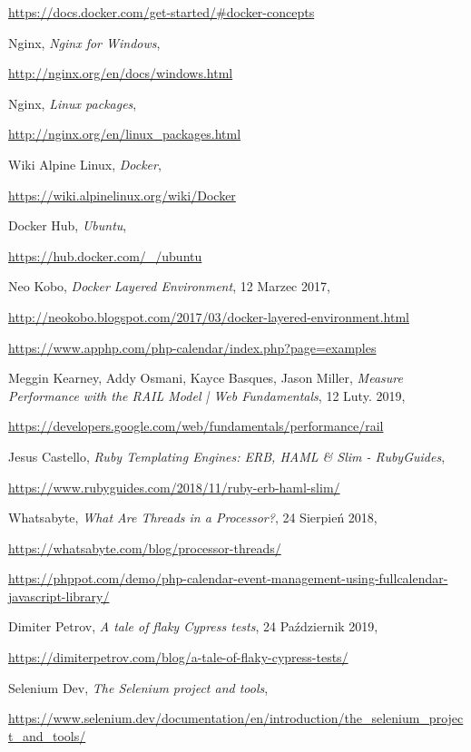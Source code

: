 \begin{thebibliography}{99}
\url{https://docs.docker.com/get-started/#docker-concepts}

Nginx,
\emph{Nginx for Windows},

\url{http://nginx.org/en/docs/windows.html}

Nginx, 
\emph{Linux packages},

\url{http://nginx.org/en/linux_packages.html}

Wiki Alpine Linux, 
\emph{Docker},

\url{https://wiki.alpinelinux.org/wiki/Docker}

Docker Hub,
\emph{Ubuntu},

\url{https://hub.docker.com/_/ubuntu}


Neo Kobo,
\emph{Docker Layered Environment},
12 Marzec 2017,

\url{http://neokobo.blogspot.com/2017/03/docker-layered-environment.html}

\url{https://www.apphp.com/php-calendar/index.php?page=examples}

Meggin Kearney, Addy Osmani, Kayce Basques, Jason Miller,
\emph{Measure Performance with the RAIL Model | Web Fundamentals},
12 Luty. 2019,

\url{https://developers.google.com/web/fundamentals/performance/rail}

Jesus Castello, 
\emph{Ruby Templating Engines: ERB, HAML \& Slim - RubyGuides},

\url{https://www.rubyguides.com/2018/11/ruby-erb-haml-slim/}

Whatsabyte,
\emph{What Are Threads in a Processor?},
24 Sierpień 2018,

\url{https://whatsabyte.com/blog/processor-threads/}

\url{https://phppot.com/demo/php-calendar-event-management-using-fullcalendar-javascript-library/}

Dimiter Petrov,
\emph{A tale of flaky Cypress tests},
24 Październik 2019,

\url{https://dimiterpetrov.com/blog/a-tale-of-flaky-cypress-tests/}

Selenium Dev,
\emph{The Selenium project and tools},

\url{https://www.selenium.dev/documentation/en/introduction/the_selenium_project_and_tools/}


\end{thebibliography}
